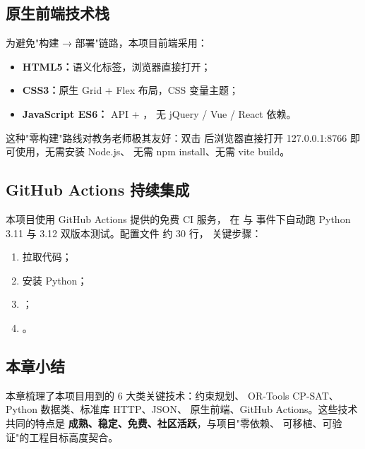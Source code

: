 \subsection{原生前端技术栈}

为避免"构建 → 部署"链路，本项目前端采用：
\begin{itemize}[leftmargin=2em,itemsep=0.1em]
\item \textbf{HTML5：}语义化标签，浏览器直接打开；
\item \textbf{CSS3：}原生 Grid + Flex 布局，CSS 变量主题；
\item \textbf{JavaScript ES6：} API + ，
无 jQuery / Vue / React 依赖。
\end{itemize}

这种"零构建"路线对教务老师极其友好：双击 
后浏览器直接打开 127.0.0.1:8766 即可使用，无需安装 Node.js、
无需 npm install、无需 vite build。

\subsection{GitHub Actions 持续集成}

本项目使用 GitHub Actions 提供的免费 CI 服务，
在  与  事件下自动跑
Python 3.11 与 3.12 双版本测试。配置文件
 约 30 行，
关键步骤：
\begin{enumerate}[leftmargin=2em,itemsep=0.2em]
\item {} 拉取代码；
\item {} 安装 Python；
\item {}；
\item {}。
\end{enumerate}

\subsection{本章小结}

本章梳理了本项目用到的 6 大类关键技术：约束规划、
OR-Tools CP-SAT、Python 数据类、标准库 HTTP、JSON、
原生前端、GitHub Actions。这些技术共同的特点是
\textbf{成熟、稳定、免费、社区活跃}，与项目"零依赖、
可移植、可验证"的工程目标高度契合。
